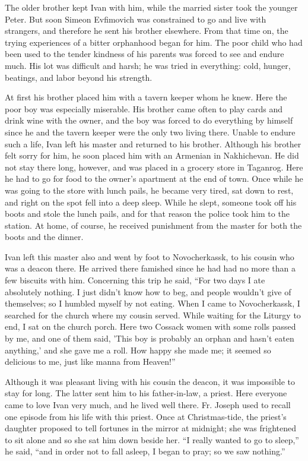 The older brother kept Ivan with him, while the married sister took the younger Peter. But soon Simeon Evfimovich was constrained to go and live with strangers, and therefore he sent his brother elsewhere. From that time on, the trying experiences of a bitter orphanhood began for him. The poor child who had been used to the tender kindness of his parents was forced to see and endure much. His lot was difficult and harsh; he was tried in everything: cold, hunger, beatings, and labor beyond his strength.

At first his brother placed him with a tavern keeper whom he knew. Here the poor boy was especially miserable. His brother came often to play cards and drink wine with the owner, and the boy was forced to do everything by himself since he and the tavern keeper were the only two living there. Unable to endure such a life, Ivan left his master and returned to his brother. Although his brother felt sorry for him, he soon placed him with an Armenian in Nakhichevan. He did not stay there long, however, and was placed in a grocery store in Taganrog. Here he had to go for food to the owner's apartment at the end of town. Once while he was going to the store with lunch pails, he became very tired, sat down to rest, and right on the spot fell into a deep sleep. While he slept, someone took off his boots and stole the lunch pails, and for that reason the police took him to the station. At home, of course, he received punishment from the master for both the boots and the dinner.

Ivan left this master also and went by foot to Novocherkassk, to his cousin who was a deacon there. He arrived there famished since he had had no more than a few biscuits with him. Concerning this trip he said, ``For two days I ate absolutely nothing. I just didn't know how to beg, and people wouldn't give of themselves; so I humbled myself by not eating. When I came to Novocherkassk, I searched for the church where my cousin served. While waiting for the Liturgy to end, I sat on the church porch. Here two Cossack women with some rolls passed by me, and one of them said, 'This boy is probably an orphan and hasn't eaten anything,' and she gave me a roll. How happy she made me; it seemed so delicious to me, just like manna from Heaven!''

Although it was pleasant living with his cousin the deacon, it was impossible to stay for long. The latter sent him to his father-in-law, a priest. Here everyone came to love Ivan very much, and he lived well there. Fr. Joseph used to recall one episode from his life with this priest. Once at Christmas-tide, the priest's daughter proposed to tell fortunes in the mirror at midnight; she was frightened to sit alone and so she sat him down beside her. ``I really wanted to go to sleep,'' he said, ``and in order not to fall asleep, I began to pray; so we saw nothing.''

